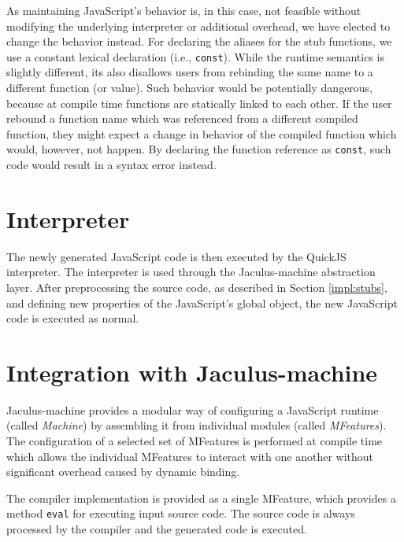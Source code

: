 
As maintaining JavaScript's behavior is, in this case, not feasible without modifying the underlying interpreter or additional overhead, we have elected to change the behavior instead. For declaring the aliases for the stub functions, we use a constant lexical declaration (i.e., \texttt{const}). While the runtime semantics is slightly different, its also disallows users from rebinding the same name to a different function (or value). Such behavior would be potentially dangerous, because at compile time functions are statically linked to each other. If the user rebound a function name which was referenced from a different compiled function, they might expect a change in behavior of the compiled function which would, however, not happen. By declaring the function reference as \texttt{const}, such code would result in a syntax error instead.


\section{Interpreter}

The newly generated JavaScript code is then executed by the QuickJS interpreter. The interpreter is used through the Jaculus-machine abstraction layer. After preprocessing the source code, as described in Section \ref{impl:stubs}, and defining new properties of the JavaScript's global object, the new JavaScript code is executed as normal.

\section{Integration with Jaculus-machine}

Jaculus-machine provides a modular way of configuring a JavaScript runtime (called \textit{Machine}) by assembling it from individual modules (called \textit{MFeatures}). The configuration of a selected set of MFeatures is performed at compile time which allows the individual MFeatures to interact with one another without significant overhead caused by dynamic binding.

The compiler implementation is provided as a single MFeature, which provides a method \texttt{eval} for executing input source code. The source code is always processed by the compiler and the generated code is executed.
